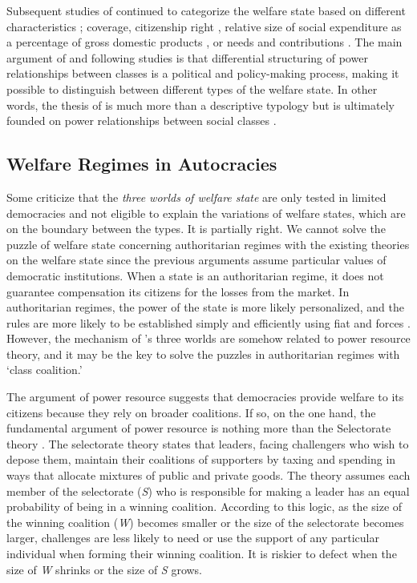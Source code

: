 \documentclass[11pt, notitlepage]{article}
\begin{document}
Subsequent studies of \citet{Gosta1990} continued to categorize the welfare state based on different characteristics \citep[14]{Arcanjo2006}; coverage, citizenship right \citep{Ferrera1996}, relative size of social expenditure as a percentage of gross domestic products \citep{Bonoli1997}, or needs and contributions \citep{Korpi1998}. The main argument of \citet{Gosta1990} and following studies is that differential structuring of power relationships between classes is a political and policy-making process, making it possible to distinguish between different types of the welfare state. In other words, the thesis of \citet{Gosta1990} is much more than a descriptive typology but is ultimately founded on power relationships between social classes \citep[89]{Kemeny1995}.\par

\subsection{Welfare Regimes in Autocracies}

Some criticize that the \textit{three worlds of welfare state} are only tested in limited democracies and not eligible to explain the variations of welfare states, which are on the boundary between the types. It is partially right. We cannot solve the puzzle of welfare state concerning authoritarian regimes with the existing theories on the welfare state since the previous arguments assume particular values of democratic institutions. When a state is an authoritarian regime, it does not guarantee compensation its citizens for the losses from the market. In authoritarian regimes, the power of the state is more likely personalized, and the rules are more likely to be established simply and efficiently using fiat and forces \citep[4]{Gerring2012}. However, the mechanism of \citet{Gosta1990}'s three worlds are somehow related to power resource theory, and it may be the key to solve the puzzles in authoritarian regimes with `class coalition.' \par

The argument of power resource suggests that democracies provide welfare to its citizens because they rely on broader coalitions. If so, on the one hand, the fundamental argument of power resource is nothing more than the Selectorate theory \citep{BDM1999, BuenodeMesquita2003}. The selectorate theory states that leaders, facing challengers who wish to depose them, maintain their coalitions of supporters by taxing and spending in ways that allocate mixtures of public and private goods. The theory assumes each member of the selectorate (\textit{S}) who is responsible for making a leader has an equal probability of being in a  winning coalition. According to this logic, as the size of the winning coalition (\textit{W}) becomes smaller or the size of the selectorate becomes larger, challenges are less likely to need or use the support of any particular individual when forming their winning coalition. It is riskier to defect when the size of \textit{W} shrinks or the size of \textit{S} grows.\par 
\end{document}
